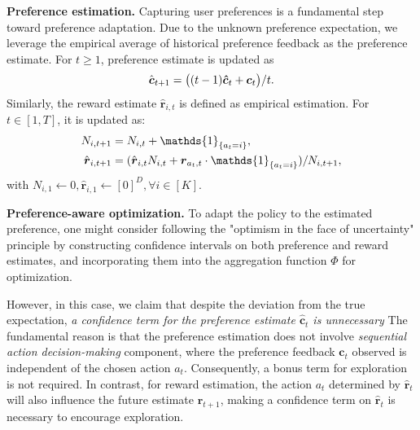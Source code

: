 \textbf{Preference estimation.}
Capturing user preferences is a fundamental step toward preference adaptation. Due to the unknown preference expectation, we leverage the empirical average of historical preference feedback as the preference estimate. For $t \geq 1$, preference estimate is updated as
\vspace{-3pt}
\begin{equation}
\label{eq:PRUCB_SPM_c_t}
\textstyle
\hat{\boldsymbol{c}}_{t+1} = \big( (t-1) \boldsymbol{\hat{c}}_{t} + \boldsymbol{c}_{t} \big)/t.
\vspace{-3pt}
\end{equation}
Similarly, the reward estimate $\hat{\boldsymbol{r}}_{i,t}$ is defined as empirical estimation. For $t \in [1,T]$, it is updated as:
\vspace{-3pt}
\begin{equation}
\begin{aligned}
\textstyle
\label{eq:prucb_r_t}
N_{i, t+1} &= N_{i, t} + \mathds{1}_{ \{a_{t} = i \}}, \\
\hat{\boldsymbol{r}}_{i,t+1} & = (\hat{\boldsymbol{r}}_{i,t} N_{i, t} + \boldsymbol{r}_{a_{t}, t} \cdot \mathds{1}_{ \{a_{t} = i \}} )/N_{i, t+1},
\vspace{-5pt}
\end{aligned}
\end{equation}
with $N_{i, 1} \leftarrow 0, \boldsymbol{\hat{r}}_{i, 1} \leftarrow [0]^D, \forall i \in [K]$. 


\textbf{Preference-aware optimization.}
To adapt the policy to the estimated preference, one might consider following the "optimism in the face of uncertainty" principle \cite{auer2002finite} by constructing confidence intervals on both preference and reward estimates, and incorporating them into the aggregation function $\Phi$ for optimization.


However, in this case, we claim that despite the deviation from the true expectation, \emph{a confidence term for the preference estimate $\hat{\boldsymbol{c}}_t$ is unnecessary} 
The fundamental reason is that the preference estimation does not involve \emph{sequential action decision-making} component, where the preference feedback ${\boldsymbol{c}}_t$ observed is independent of the chosen action $a_t$.
Consequently, a bonus term for exploration is not required.
In contrast, for reward estimation, the action $a_t$ determined by $\hat{\boldsymbol{r}}_t$ will also influence the future estimate $\hat{\boldsymbol{r}}_{t+1}$, making a confidence term on $\hat{\boldsymbol{r}}_t$ is necessary to encourage exploration.

